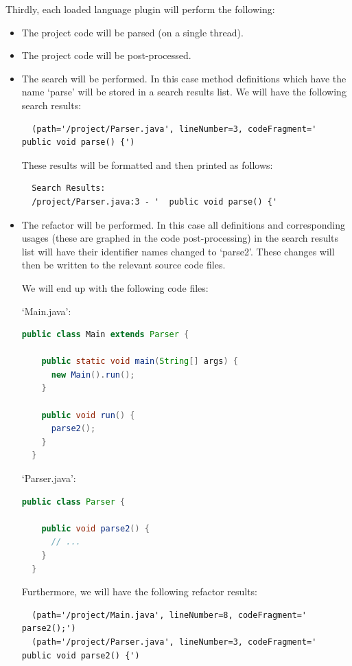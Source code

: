 \documentclass[12pt, letterpaper]{article}
\begin{document}
Thirdly, each loaded language plugin will perform the following:
\begin{itemize}
  \item The project code will be parsed (on a single thread).
  \item The project code will be post-processed.
  \item The search will be performed.
  In this case method definitions which have the name `parse' will be stored in a search results list.
  We will have the following search results:
  \begin{lstlisting}
  (path='/project/Parser.java', lineNumber=3, codeFragment='  public void parse() {')
  \end{lstlisting}

  These results will be formatted and then printed as follows:
  \begin{lstlisting}
  Search Results:
  /project/Parser.java:3 - '  public void parse() {'
  \end{lstlisting}
  \item The refactor will be performed.
  In this case all definitions and corresponding usages (these are graphed in the code post-processing) in the search results list will have their identifier names changed to `parse2'.
  These changes will then be written to the relevant source code files.
  
  We will end up with the following code files:

  `Main.java':
  \begin{lstlisting}[language=Java]
  public class Main extends Parser {
  
    public static void main(String[] args) {
      new Main().run();
    }
  
    public void run() {
      parse2();
    }
  }
  \end{lstlisting}
  
  `Parser.java':
  \begin{lstlisting}[language=Java]
  public class Parser {
  
    public void parse2() {
      // ...
    }
  }
  \end{lstlisting}
  
  Furthermore, we will have the following refactor results:
  \begin{lstlisting}
  (path='/project/Main.java', lineNumber=8, codeFragment='    parse2();')
  (path='/project/Parser.java', lineNumber=3, codeFragment='  public void parse2() {')
  \end{lstlisting}
\end{itemize}
\end{document}
